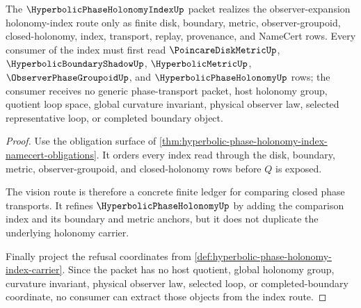 \begin{theorem}
\label{thm:hyperbolic-phase-holonomy-index-vision-route}
The $\HyperbolicPhaseHolonomyIndexUp$ packet realizes the observer-expansion holonomy-index route only as finite disk, boundary, metric, observer-groupoid, closed-holonomy, index, transport, replay, provenance, and NameCert rows. Every consumer of the index must first read $\PoincareDiskMetricUp$, $\HyperbolicBoundaryShadowUp$, $\HyperbolicMetricUp$, $\ObserverPhaseGroupoidUp$, and $\HyperbolicPhaseHolonomyUp$ rows; the consumer receives no generic phase-transport packet, host holonomy group, quotient loop space, global curvature invariant, physical observer law, selected representative loop, or completed boundary object.
\end{theorem}
\begin{proof}
Use the obligation surface of \autoref{thm:hyperbolic-phase-holonomy-index-namecert-obligations}. It orders every index read through the disk, boundary, metric, observer-groupoid, and closed-holonomy rows before $Q$ is exposed.

The vision route is therefore a concrete finite ledger for comparing closed phase transports. It refines $\HyperbolicPhaseHolonomyUp$ by adding the comparison index and its boundary and metric anchors, but it does not duplicate the underlying holonomy carrier.

Finally project the refusal coordinates from \autoref{def:hyperbolic-phase-holonomy-index-carrier}. Since the packet has no host quotient, global holonomy group, curvature invariant, physical observer law, selected loop, or completed-boundary coordinate, no consumer can extract those objects from the index route.
\end{proof}



